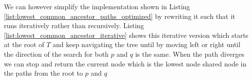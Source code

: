 	



We can however simplify the implementation shown in Listing
\ref{list:lowest_common_ancestor_paths_optimized} by rewriting it such that it runs iteratively
rather than recursively. Listing \ref{list:lowest_common_ancestor_iterative} shows this iterative version which starts at the root of $T$
and keep navigating the tree until by moving left or right until the direction of the search for
both $p$ and $q$ is the same. When the path diverges we can stop and return the current node which
is the lowest node shared node in the paths from the root to $p$ and $q$


	

